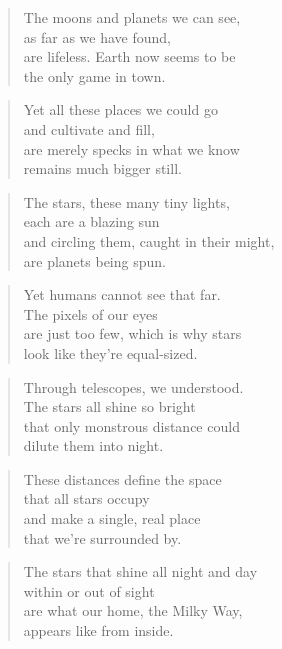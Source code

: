 \documentclass[10pt,a4paper]{article}
\begin{document}
\begin{multicols}{2}
\begin{verse}
The moons and planets we can see,\\
as far as we have found,\\
are lifeless. Earth now seems to be\\
the only game in town.
\end{verse}

\begin{verse}
Yet all these places we could go\\
and cultivate and fill,\\
are merely specks in what we know\\
remains much bigger still.
\end{verse}

\begin{verse}
The stars, these many tiny lights,\\
each are a blazing sun\\
and circling them, caught in their might,\\
are planets being spun.
\end{verse}

\begin{verse}
Yet humans cannot see that far.\\
The pixels of our eyes\\
are just too few, which is why stars\\
look like they’re equal-sized.
\end{verse}

\begin{verse}
Through telescopes, we understood.\\
The stars all shine so bright\\
that only monstrous distance could\\
dilute them into night.
\end{verse}

\begin{verse}
These distances define the space\\
that all stars occupy\\
and make a single, real place\\
that we’re surrounded by.
\end{verse}

\begin{verse}
The stars that shine all night and day\\
within or out of sight\\
are what our home, the Milky Way,\\
appears like from inside.
\end{verse}


\end{multicols}
\end{document}
